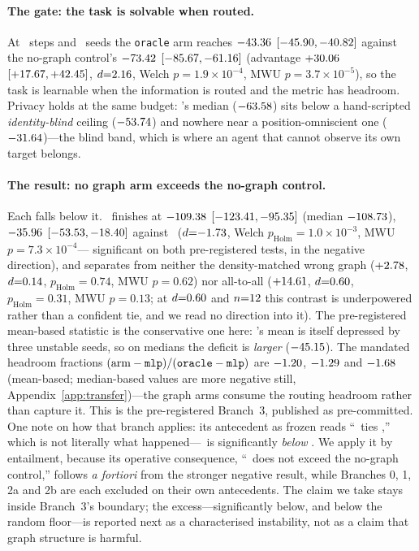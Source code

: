 \paragraph{The gate: the task is solvable when routed.} At \PDsteps\ steps and
\PDseeds\ seeds the \texttt{oracle} arm reaches $-43.36$ $[-45.90, -40.82]$
against the no-graph control's $-73.42$ $[-85.67, -61.16]$ (advantage $+30.06$
$[+17.67, +42.45]$, $d{=}2.16$, Welch $p{=}1.9{\times}10^{-4}$, MWU
$p{=}3.7{\times}10^{-5}$), so the task is learnable when the information is
routed and the metric has headroom. Privacy holds at the same budget: \mlpc's
median ($-63.58$) sits below a hand-scripted \emph{identity-blind} ceiling
($-53.74$) and nowhere near a position-omniscient one ($-31.64$)---the
blind band, which is where an agent that cannot observe its own target belongs.

\paragraph{The result: no graph arm exceeds the no-graph control.} Each falls
below it. \gtrue\ finishes at $-109.38$ $[-123.41, -95.35]$ (median $-108.73$),
$-35.96$ $[-53.53, -18.40]$ against \mlpc\ ($d{=}{-}1.73$, Welch
$p_{\text{Holm}}{=}1.0{\times}10^{-3}$, MWU $p{=}7.3{\times}10^{-4}$---%
significant on both pre-registered tests, in the negative direction), and
separates from neither the density-matched wrong graph ($+2.78$,
$d{=}0.14$, $p_{\text{Holm}}{=}0.74$, MWU $p{=}0.62$) nor all-to-all
($+14.61$, $d{=}0.60$, $p_{\text{Holm}}{=}0.31$, MWU $p{=}0.13$; at
$d{=}0.60$ and $n{=}12$ this contrast is underpowered rather than a
confident tie, and we read no direction into it). The pre-registered mean-based
statistic is the conservative one here: \mlpc's mean is itself depressed by
three unstable seeds, so on medians the deficit is \emph{larger}
($-45.15$). The mandated headroom fractions
$(\text{arm}-\texttt{mlp})/(\texttt{oracle}-\texttt{mlp})$ are $-1.20$, $-1.29$ and
$-1.68$ (mean-based; median-based values are more negative still,
Appendix~\ref{app:transfer})---the graph arms consume the routing headroom
rather than capture it. This is the pre-registered Branch~3, published as
pre-committed. One note on how that branch applies: its antecedent as frozen
reads ``\gtrue\ ties \mlpc,'' which is not literally what happened---\gtrue\ is
significantly \emph{below} \mlpc. We apply it by entailment, because its
operative consequence, ``\gtrue\ does not exceed the no-graph control,''
follows \emph{a fortiori} from the stronger negative result, while Branches 0,
1, 2a and 2b are each excluded on their own antecedents. The claim we take
stays inside Branch~3's boundary; the excess---significantly below, and below
the random floor---is reported next as a characterised instability, not as a
claim that graph structure is harmful.

